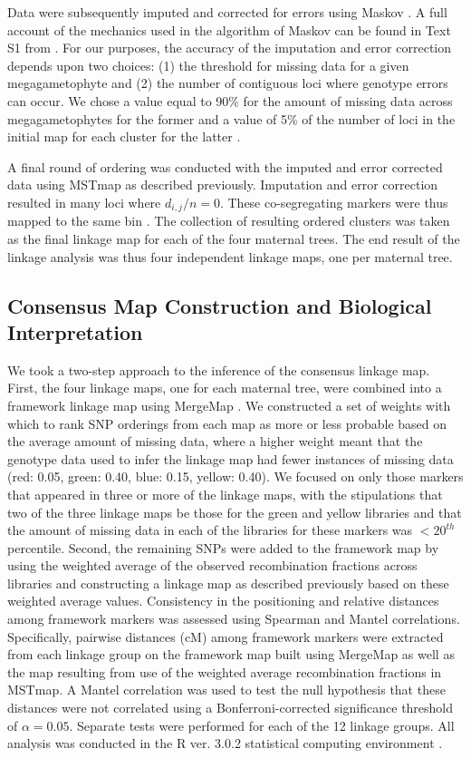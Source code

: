 \documentclass[smallextended]{svjour3}
\begin{document}
Data were subsequently imputed and corrected for errors using Maskov
\citep{Ward:2013}. A full account of the mechanics used in the algorithm of
Maskov can be found in Text S1 from \citet{Ward:2013}. For our purposes, the
accuracy of the imputation and error correction depends upon two choices: (1)
the threshold for missing data for a given megagametophyte and (2) the number of
contiguous loci where genotype errors can occur. We chose a value equal to 90\%
for the amount of missing data across megagametophytes for the former and a
value of 5\% of the number of loci in the initial map for each cluster for the
latter \citep[cf.,][]{Ward:2013}.

A final round of ordering was conducted with the imputed and error corrected
data using MSTmap as described previously. Imputation and error correction
resulted in many loci where $d_{i,j}/n = 0$. These co-segregating markers were
thus mapped to the same bin \citep{Wu:2008a}. The collection of resulting
ordered clusters was taken as the final linkage map for each of the four
maternal trees.  The end result of the linkage analysis was thus four
independent linkage maps, one per maternal tree.

\subsection*{Consensus Map Construction and Biological
  Interpretation}\label{ss:consensus}
We took a two-step approach to the inference of the consensus linkage
map. First, the four linkage maps, one for each maternal tree, were combined
into a framework linkage map using MergeMap \citep{Wu:2008b}.  We constructed a
set of weights with which to rank SNP orderings from each map as more or less
probable based on the average amount of missing data, where a higher weight
meant that the genotype data used to infer the linkage map had fewer instances
of missing data (red: 0.05, green: 0.40, blue: 0.15, yellow: 0.40). We focused on
only those markers that appeared in three or more of the linkage maps, with the
stipulations that two of the three linkage maps
be those for the green and yellow libraries and that the amount of missing data
in each of the libraries for these markers was $< 20^{th}$ percentile. Second,
the remaining SNPs were added to the framework map by using the weighted average
of the observed recombination fractions across libraries and constructing a
linkage map as described previously based on these weighted average
values. Consistency in the positioning and relative distances among framework
markers was assessed using Spearman \citep{Spearman:1904} and Mantel
\citep{Mantel:1967} correlations. Specifically, pairwise distances (cM) among
framework markers were extracted from each linkage group on the framework map
built using MergeMap as well as the map resulting from use of the weighted
average recombination fractions in MSTmap.  A Mantel correlation was used to
test the null hypothesis that these distances were not correlated using a
Bonferroni-corrected significance threshold of $\alpha = 0.05$. Separate tests
were performed for each of the 12 linkage groups. All analysis was conducted in
the R ver. 3.0.2 statistical computing environment \citep{R:2013}.
\end{document}
